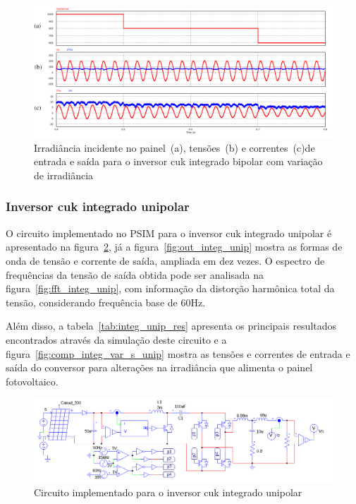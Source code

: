\documentclass[
	12pt,				%
	openany,
	onseside,
	a4paper,			%
	english,			%
	french,				%
	spanish,			%
	brazil,				%
	]{abntex2}
\begin{document}
\begin{figure}[H]%
	\captionsetup{justification=centering}
	\centering
		\includegraphics[width= \linewidth]{comp_integ_var_s}
		\caption{Irradiância incidente no painel~(a), tensões~(b) e correntes~(c)de entrada e saída para o inversor cuk integrado bipolar com variação de irradiância}
		\label{fig:comp_integ_var_s}
\end{figure}
\subsubsection{Inversor cuk integrado unipolar}

O circuito implementado no PSIM para o inversor cuk integrado unipolar é apresentado na figura~\ref{fig:comp_integ_circ_clean_unip}, já a figura~\ref{fig:out_integ_unip} mostra as formas de onda de tensão e corrente de saída, ampliada em dez vezes. O espectro de frequências da tensão de saída obtida pode ser analisada na figura~\ref{fig:fft_integ_unip},  com informação da distorção harmônica total da tensão, considerando frequência base de 60Hz.

Além disso, a tabela~\ref{tab:integ_unip_res} apresenta os principais resultados encontrados através da simulação deste circuito e a figura~\ref{fig:comp_integ_var_s_unip} mostra as tensões e correntes de entrada e saída do conversor para alterações na irradiância que alimenta o painel fotovoltaico.

\begin{figure}[htb]%
	\captionsetup{justification=centering}
	\centering
		\includegraphics[width= \linewidth]{comp_integ_circ_clean_unip}
		\caption{Circuito implementado para o inversor cuk integrado unipolar}
		\label{fig:comp_integ_circ_clean_unip}
\end{figure}
\end{document}
